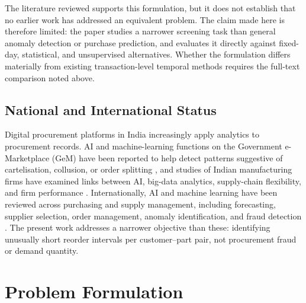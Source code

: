 \documentclass[conference]{IEEEtran}
\begin{document}
The literature reviewed supports this formulation, but it does not establish that no earlier work has addressed an equivalent problem. The claim made here is therefore limited: the paper studies a narrower screening task than general anomaly detection or purchase prediction, and evaluates it directly against fixed-day, statistical, and unsupervised alternatives. Whether the formulation differs materially from existing transaction-level temporal methods requires the full-text comparison noted above.

\subsection{National and International Status}
Digital procurement platforms in India increasingly apply analytics to procurement records. AI and machine-learning functions on the Government e-Marketplace (GeM) have been reported to help detect patterns suggestive of cartelisation, collusion, or order splitting \cite{gem2026}, and studies of Indian manufacturing firms have examined links between AI, big-data analytics, supply-chain flexibility, and firm performance \cite{india2025}. Internationally, AI and machine learning have been reviewed across purchasing and supply management, including forecasting, supplier selection, order management, anomaly identification, and fraud detection \cite{spreitzenbarth2024,balkan2025}. The present work addresses a narrower objective than these: identifying unusually short reorder intervals per customer--part pair, not procurement fraud or demand quantity.

\section{Problem Formulation}\label{sec:problem}
\end{document}
